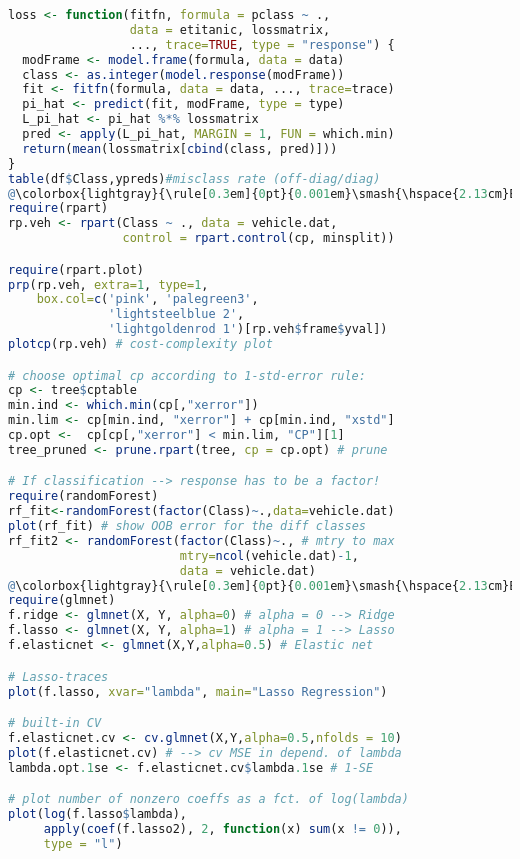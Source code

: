 \begin{lstlisting}[language=R]
loss <- function(fitfn, formula = pclass ~ ., 
                 data = etitanic, lossmatrix,
                 ..., trace=TRUE, type = "response") {
  modFrame <- model.frame(formula, data = data)
  class <- as.integer(model.response(modFrame))
  fit <- fitfn(formula, data = data, ..., trace=trace)
  pi_hat <- predict(fit, modFrame, type = type)
  L_pi_hat <- pi_hat %*% lossmatrix
  pred <- apply(L_pi_hat, MARGIN = 1, FUN = which.min)
  return(mean(lossmatrix[cbind(class, pred)]))
}
table(df$Class,ypreds)#misclass rate (off-diag/diag)
@\colorbox{lightgray}{\rule[0.3em]{0pt}{0.001em}\smash{\hspace{2.13cm}Exercise 10\hspace{2.13cm}}}@
require(rpart)
rp.veh <- rpart(Class ~ ., data = vehicle.dat,
                control = rpart.control(cp, minsplit))

require(rpart.plot)
prp(rp.veh, extra=1, type=1,
    box.col=c('pink', 'palegreen3',
              'lightsteelblue 2',
              'lightgoldenrod 1')[rp.veh$frame$yval])
plotcp(rp.veh) # cost-complexity plot

# choose optimal cp according to 1-std-error rule:
cp <- tree$cptable
min.ind <- which.min(cp[,"xerror"])
min.lim <- cp[min.ind, "xerror"] + cp[min.ind, "xstd"]
cp.opt <-  cp[cp[,"xerror"] < min.lim, "CP"][1]
tree_pruned <- prune.rpart(tree, cp = cp.opt) # prune

# If classification --> response has to be a factor!
require(randomForest) 
rf_fit<-randomForest(factor(Class)~.,data=vehicle.dat) 
plot(rf_fit) # show OOB error for the diff classes
rf_fit2 <- randomForest(factor(Class)~., # mtry to max 
                        mtry=ncol(vehicle.dat)-1, 
                        data = vehicle.dat) 
@\colorbox{lightgray}{\rule[0.3em]{0pt}{0.001em}\smash{\hspace{2.13cm}Exercise 11\hspace{2.13cm}}}@
require(glmnet)
f.ridge <- glmnet(X, Y, alpha=0) # alpha = 0 --> Ridge
f.lasso <- glmnet(X, Y, alpha=1) # alpha = 1 --> Lasso
f.elasticnet <- glmnet(X,Y,alpha=0.5) # Elastic net

# Lasso-traces
plot(f.lasso, xvar="lambda", main="Lasso Regression") 

# built-in CV
f.elasticnet.cv <- cv.glmnet(X,Y,alpha=0.5,nfolds = 10) 
plot(f.elasticnet.cv) # --> cv MSE in depend. of lambda
lambda.opt.1se <- f.elasticnet.cv$lambda.1se # 1-SE

# plot number of nonzero coeffs as a fct. of log(lambda)
plot(log(f.lasso$lambda), 
     apply(coef(f.lasso2), 2, function(x) sum(x != 0)),
     type = "l") 


\end{lstlisting}
